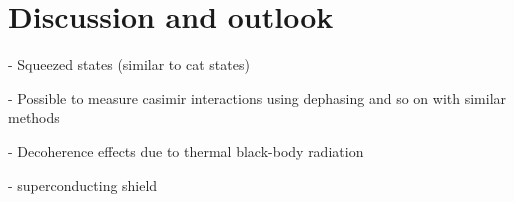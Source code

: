 \chapter{Discussion and outlook}\label{cha:discussion-outlook}

- Squeezed states (similar to cat states) \cite{Pedernales_2023}

- Possible to measure casimir interactions using dephasing and so on with similar methods

- Decoherence effects due to thermal black-body radiation

- superconducting shield
